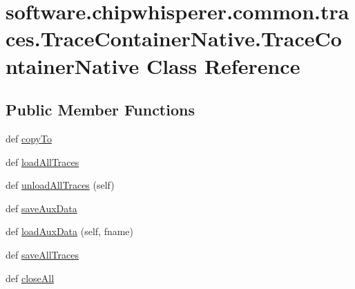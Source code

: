 \hypertarget{classsoftware_1_1chipwhisperer_1_1common_1_1traces_1_1TraceContainerNative_1_1TraceContainerNative}{}\section{software.\+chipwhisperer.\+common.\+traces.\+Trace\+Container\+Native.\+Trace\+Container\+Native Class Reference}
\label{classsoftware_1_1chipwhisperer_1_1common_1_1traces_1_1TraceContainerNative_1_1TraceContainerNative}
\subsection*{Public Member Functions}
\begin{DoxyCompactItemize}
\item 
def \hyperlink{classsoftware_1_1chipwhisperer_1_1common_1_1traces_1_1TraceContainerNative_1_1TraceContainerNative_a2061f6ca4d506fd079db043bf1ae9618}{copy\+To}
\item 
def \hyperlink{classsoftware_1_1chipwhisperer_1_1common_1_1traces_1_1TraceContainerNative_1_1TraceContainerNative_a917c3dcc97d8e6643c46f40ad0c89e89}{load\+All\+Traces}
\item 
def \hyperlink{classsoftware_1_1chipwhisperer_1_1common_1_1traces_1_1TraceContainerNative_1_1TraceContainerNative_a24a233b0e59f5390991166d4e4bd086a}{unload\+All\+Traces} (self)
\item 
def \hyperlink{classsoftware_1_1chipwhisperer_1_1common_1_1traces_1_1TraceContainerNative_1_1TraceContainerNative_a7573605e6771815e2be237fe86ea559d}{save\+Aux\+Data}
\item 
def \hyperlink{classsoftware_1_1chipwhisperer_1_1common_1_1traces_1_1TraceContainerNative_1_1TraceContainerNative_a8cea1e6504cc3e6ccd9f25780bb9b027}{load\+Aux\+Data} (self, fname)
\item 
def \hyperlink{classsoftware_1_1chipwhisperer_1_1common_1_1traces_1_1TraceContainerNative_1_1TraceContainerNative_a103ba7a3d7661d1e30830d8d7791c7d9}{save\+All\+Traces}
\item 
def \hyperlink{classsoftware_1_1chipwhisperer_1_1common_1_1traces_1_1TraceContainerNative_1_1TraceContainerNative_ab5698cc98bbc32b4c493e3072058e0da}{close\+All}
\end{DoxyCompactItemize}
